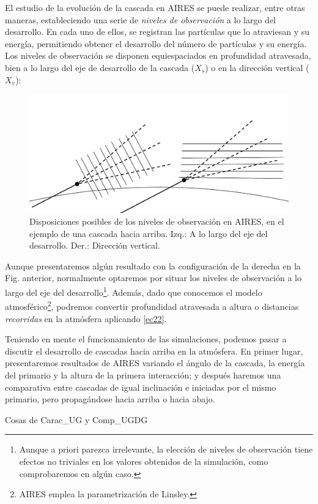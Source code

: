 \documentclass[12 pt, a4paper]{article} %
\numberwithin{equation}{section}
\numberwithin{figure}{section}
\numberwithin{table}{section}
\begin{document}
El estudio de la evolución de la cascada en AIRES se puede realizar, entre otras maneras, estableciendo una serie de \textit{niveles de observación} a lo largo del desarrollo. En cada uno de ellos, se registran las partículas que lo atraviesan y su energía, permitiendo obtener el desarrollo del número de partículas y su energía. Los niveles de observación se disponen equiespaciados en profundidad atravesada, bien a lo largo del eje de desarrollo de la cascada ($X_s$) o en la dirección vertical ($X_v$):
\clearpage
	\begin{figure}[H]
		\centering
		\includegraphics[width=.7\linewidth]{figures/cascadas/AIRES_planos}
		\caption{Disposiciones posibles de los niveles de observación en AIRES, en el ejemplo de una cascada hacia arriba. Izq.: A lo largo del eje del desarrollo. Der.: Dirección vertical.}
		\label{AIRES_planos}
	\end{figure}
	
Aunque presentaremos algún resultado con la configuración de la derecha en la Fig. anterior, normalmente optaremos por situar los niveles de observación a lo largo del eje del desarrollo\footnote{ Aunque a priori parezca irrelevante, la elección de niveles de observación tiene efectos no triviales en los valores obtenidos de la simulación, como comprobaremos en algún caso.}. Además, dado que conocemos el modelo atmosférico\footnote{ AIRES emplea la parametrización de Linsley.}, podremos convertir profundidad atravesada a altura o distancias \textit{recorridas} en la atmósfera aplicando \eqref{ec22}.

Teniendo en mente el funcionamiento de las simulaciones, podemos pasar a discutir el desarrollo de cascadas hacia arriba en la atmósfera. En primer lugar, presentaremos resultados de AIRES variando el ángulo de la cascada, la energía del primario y la altura de la primera interacción; y después haremos una comparativa entre cascadas de igual inclinación e iniciadas por el mismo primario, pero propagándose hacia arriba o hacia abajo.

	Cosas de Carac\_UG y Comp\_UGDG
	\clearpage %
\end{document}
